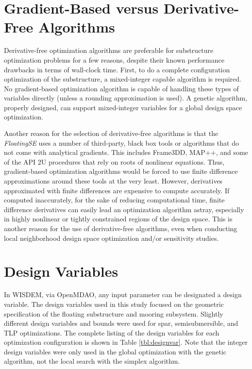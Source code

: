 \section{Gradient-Based versus Derivative-Free Algorithms}
Derivative-free optimization algorithms are preferable for substructure
optimization problems for a few reasons, despite their known performance
drawbacks in terms of wall-clock time.  First, to do a complete
configuration optimization of the substructure, a mixed-integer capable
algorithm is required.  No gradient-based optimization algorithm is
capable of handling these types of variables directly (unless a rounding
approximation is used).  A genetic algorithm, properly designed, can
support mixed-integer variables for a global design space optimization.

Another reason for the selection of derivative-free algorithms is that
the \textit{FloatingSE} uses a number of third-party, black box tools or
algorithms that do not come with analytical gradients.  This includes
Frame3DD, MAP++, and some of the API 2U procedures that rely on roots of
nonlinear equations.  Thus, gradient-based optimization algorithms would
be forced to use finite difference approximations around these tools at
the very least.  However, derivatives approximated with finite
differences are expensive to compute accurately.  If computed
inaccurately, for the sake of reducing computational time, finite
difference derivatives can easily lead an optimization algorithm astray,
especially in highly nonlinear or tightly constrained regions of the
design space.  This is another reason for the use of
derivative-free algorithms, even when conducting local neighborhood
design space optimization and/or sensitivity studies.


\section{Design Variables}
In WISDEM, via OpenMDAO, any input parameter can be designated a design
variable.  The design variables used in this study focused on the
geometric specification of the floating substructure and mooring
subsystem.  Slightly different design variables and bounds were used for
spar, semisubmersible, and TLP optimizations.  The complete listing of
the design variables for each optimization configuration is shown in
Table \ref{tbl:designvar}.  Note that the integer design variables were
only used in the global optimization with the genetic algorithm, not the
local search with the simplex algorithm.


